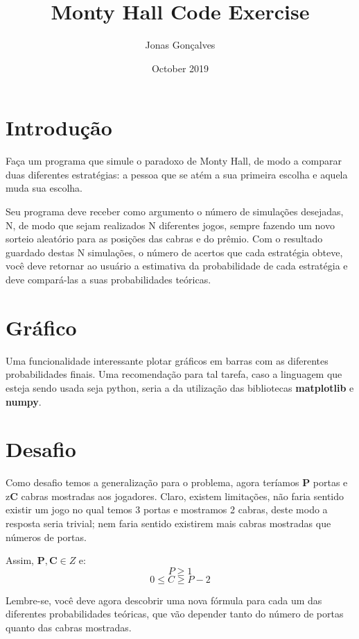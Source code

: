 \documentclass{article}
\title{Monty Hall Code Exercise}
\author{Jonas Gonçalves}
\date{October 2019}
\begin{document}
\maketitle

\section{Introdução}

Faça um programa que simule o paradoxo de Monty Hall, de modo a comparar duas diferentes estratégias: a pessoa que se atém a sua primeira escolha e aquela muda sua escolha. \par
Seu programa deve receber como argumento o número de simulações desejadas, N, de modo que sejam realizados N diferentes jogos, sempre fazendo um novo sorteio aleatório para as posições das cabras e do prêmio. Com o resultado guardado destas N simulações, o número de acertos que cada estratégia obteve, você deve retornar ao usuário a estimativa da probabilidade de cada estratégia e deve compará-las a suas probabilidades teóricas.

\section{Gráfico}

Uma funcionalidade interessante plotar gráficos em barras com as diferentes probabilidades finais. Uma recomendação para tal tarefa, caso a linguagem que esteja sendo usada seja python, seria a da utilização das bibliotecas \textbf{matplotlib} e \textbf{numpy}.

\section{Desafio}

Como desafio temos a generalização para o problema, agora teríamos \textbf{P} portas e z\textbf{C} cabras mostradas aos jogadores. Claro, existem limitações, não faria sentido existir um jogo no qual temos 3 portas e mostramos 2 cabras, deste modo a resposta seria trivial; nem faria sentido existirem mais cabras mostradas que números de portas. \par
Assim, \(\textbf{P},\textbf{C} \in Z\) e:
\[P \ge 1\] \[0 \le C \ge P-2\]

Lembre-se, você deve agora descobrir uma nova fórmula para cada um das diferentes probabilidades teóricas, que vão depender tanto do número de portas quanto das cabras mostradas.
\end{document}
